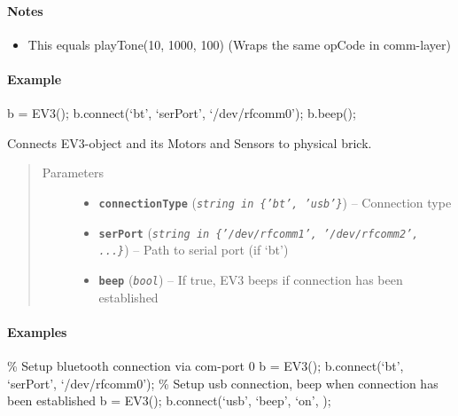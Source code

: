 \documentclass[letterpaper,10pt,english]{sphinxmanual}
\begin{document}
\begin{fulllineitems}
\begin{fulllineitems}
\paragraph{Notes}
\begin{itemize}
\item {} 
This equals playTone(10, 1000, 100) (Wraps the same opCode in comm-layer)

\end{itemize}
\paragraph{Example}

b = EV3(); 
b.connect(`bt', `serPort', `/dev/rfcomm0'); 
b.beep(); 

\end{fulllineitems}


\begin{fulllineitems}
\label{source:source.EV3.connect}
Connects EV3-object and its Motors and Sensors to physical brick.
\begin{quote}\begin{description}
\item[{Parameters}] \leavevmode\begin{itemize}
\item {} 
\textbf{\texttt{connectionType}} (\emph{\texttt{string in \{'bt', 'usb'\}}}) -- Connection type

\item {} 
\textbf{\texttt{serPort}} (\emph{\texttt{string in \{'/dev/rfcomm1', '/dev/rfcomm2', ...\}}}) -- Path to serial port
(if `bt')

\item {} 
\textbf{\texttt{beep}} (\emph{\texttt{bool}}) -- If true, EV3 beeps if connection has been established

\end{itemize}

\end{description}\end{quote}
\paragraph{Examples}

\% Setup bluetooth connection via com-port 0 
b = EV3(); 
b.connect(`bt', `serPort', `/dev/rfcomm0'); 
\% Setup usb connection, beep when connection has been established
b = EV3(); 
b.connect(`usb', `beep', `on', ); 


\end{fulllineitems}
\end{fulllineitems}
\end{document}
